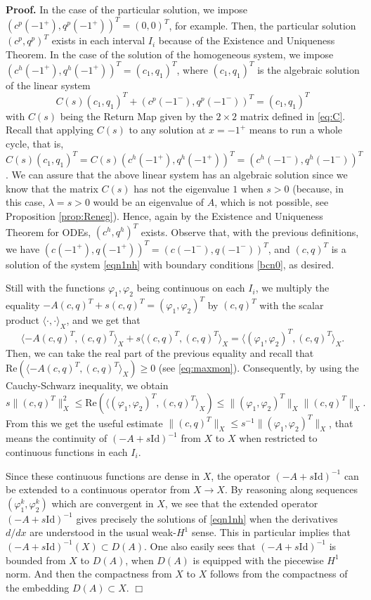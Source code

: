 \documentclass[a4paper]{article}
\def\Re{{\textrm{Re}}}
\def\Id{\rm{Id}}
\def\Id{\mathrm{Id}}
\numberwithin{equation}{section}
\newenvironment{pf}{\vspace{0.5em}\noindent\textbf{Proof.} }{\quad \hfill $\Box$ \\ \vspace{0.2em}\\}
\begin{document}
\begin{pf}
In the case of the particular solution, we impose $(c^p(-1^+),q^p(-1^+))^T=(0,0)^T$, for example. Then, the particular solution $(c^p,q^p)^T$ exists in each interval $I_i$ because of the Existence and Uniqueness Theorem. In the case of the solution of the homogeneous system, we impose $(c^h(-1^+),q^h(-1^+))^T=(c_1,q_1)^T$, where $(c_1,q_1)^T$ is the algebraic solution of the linear system
$$C(s)(c_1,q_1)^T+(c^p(-1^-),q^p(-1^-))^T=(c_1,q_1)^T$$
with $C(s)$ being the Return Map given by the $2\times2$ matrix defined in \eqref{eq:C}. Recall that applying $C(s)$ to any solution at $x=-1^+$ means to run a whole cycle, that is,  $C(s)(c_1,q_1)^T =C(s)(c^h(-1^+),q^h(-1^+))^T = (c^h(-1^-),q^h(-1^-))^T$. We can assure that the above linear system has an algebraic solution since we know that the matrix $C(s)$ has not the eigenvalue $1$ when $s>0$ (because, in this case, $\lambda=s>0$ would be an eigenvalue of $A$, which is not possible, see Proposition \ref{prop:Reneg}). Hence, again by the Existence and Uniqueness Theorem for ODEs, $(c^h,q^h)^T$ exists. Observe that, with the previous definitions, we have $(c(-1^+),q(-1^+))^T = (c(-1^-),q(-1^-))^T$, and $(c,q)^T$ is a solution of the system \eqref{eqn1nh} with boundary conditions \eqref{bcn0}, as desired.

Still with the functions $\varphi_1,\varphi_2$ being continuous on each $I_i$,  we multiply the equality $-A(c,q)^T+s(c,q)^T=(\varphi_1,\varphi_2)^T$ by $(c,q)^T$ with the scalar product $\langle\cdot,\cdot\rangle_X$, and we get that
$$\langle-A(c,q)^T,(c,q)^T\rangle_X+s\langle (c,q)^T,(c,q)^T\rangle_X=
\langle (\varphi_1,\varphi_2)^T,(c,q)^T\rangle_X.$$
Then, we can take the real part of the previous equality and recall that $\Re\left(\langle-A(c,q)^T,(c,q)^T\rangle_X\right)\ge 0$ (see \eqref{eq:maxmon}). Consequently, by using the Cauchy-Schwarz inequality, we obtain
$$
s\|(c,q)^T\|_X^2\le \Re\left(\langle (\varphi_1,\varphi_2)^T,(c,q)^T\rangle_X\right)\le\|(\varphi_1,\varphi_2)^T\|_X\|(c,q)^T\|_X.
$$
From this we get the useful estimate $\|(c,q)^T\|_X\le s^{-1}\|(\varphi_1,\varphi_2)^T\|_X$,
that means the continuity of $(-A+s\Id)^{-1}$ from $X$ to $X$ when restricted to continuous functions in each $I_i$.

Since these continuous functions are dense in $X$, the operator $(-A+s\Id)^{-1}$ can be extended to a continuous operator from $X\to X$. By reasoning along sequences $(\varphi_1^{k},\varphi_2^{k})$ which are convergent in $X$, we see that the extended operator $(-A+s\Id)^{-1}$ gives precisely the solutions of \eqref{eqn1nh} when the derivatives ${d}/{dx}$ are understood in the usual weak-$H^1$ sense. This in particular implies that $(-A+s\Id)^{-1}(X)\subset D(A)$. One also easily sees that  $ (-A+s \Id)^{-1}$ is bounded from $X$ to $D(A)$, when $D(A)$ is equipped with the piecewise $H^1$ norm. And then the compactness from $X$ to $X$ follows from the compactness of the embedding $D(A)\subset X$.
\end{pf}
\end{document}
